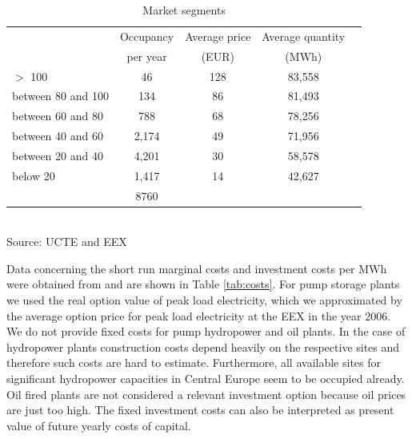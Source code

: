 \begin{table}[htb]
\centering
\caption{Market segments}
\vspace{0.3cm}
\begin{tabular}{lrrrr}
\hline
 & \multicolumn{1}{c}{Occupancy} & \multicolumn{1}{c}{Average price} & \multicolumn{1}{c}{Average quantity} &  \\ 
 & \multicolumn{1}{c}{per year} & \multicolumn{1}{c}{(EUR)} & \multicolumn{1}{c}{(MWh)} &  \\ 
 \hline
$>$ 100 & \multicolumn{1}{c}{46} & \multicolumn{1}{c}{128} & \multicolumn{1}{c}{83,558} &  \\ 
between 80 and 100 & \multicolumn{1}{c}{134} & \multicolumn{1}{c}{86} & \multicolumn{1}{c}{81,493} &  \\ 
between 60 and 80 & \multicolumn{1}{c}{788} & \multicolumn{1}{c}{68} & \multicolumn{1}{c}{78,256} &  \\ 
between 40 and 60 & \multicolumn{1}{c}{2,174} & \multicolumn{1}{c}{49} & \multicolumn{1}{c}{71,956} &  \\ 
between 20 and 40 & \multicolumn{1}{c}{4,201} & \multicolumn{1}{c}{30} & \multicolumn{1}{c}{58,578} &  \\ 
below 20 & \multicolumn{1}{c}{1,417} & \multicolumn{1}{c}{14} & \multicolumn{1}{c}{42,627} &  \\
\hline
 & \multicolumn{1}{c}{8760} &  &  &  \\ 
 \hline
\end{tabular}
\label{tab:demand}
\\
\vspace{0.3cm}
\scriptsize Source: UCTE and EEX 
\end{table}


Data concerning the short run marginal costs and investment costs per MWh were obtained from \cite{Auer2006} and are shown in Table \ref{tab:costs}. For pump storage plants we used the real option value of peak load electricity, which we approximated by the average option price for peak load electricity at the EEX in the year 2006. We do not provide fixed costs for pump hydropower and oil plants. In the case of hydropower plants construction costs depend heavily on the respective sites and therefore such costs are hard to estimate. Furthermore, all available sites for significant hydropower capacities in Central Europe seem to be occupied already. Oil fired plants are not considered a relevant investment option because oil prices are just too high. The fixed investment costs can also be interpreted as present value of future yearly costs of capital.

